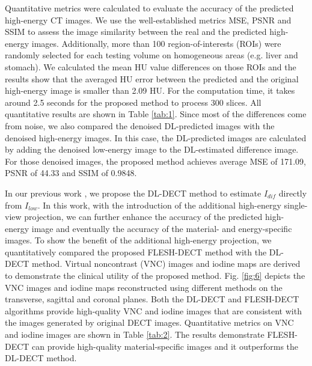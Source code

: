 \documentclass[journal,twoside,web]{ieeecolor}
\begin{document}
Quantitative metrics were calculated to evaluate the accuracy of the predicted high-energy CT images. We use the well-established metrics MSE, PSNR and SSIM to assess the image similarity between the real and the predicted high-energy images. Additionally, more than 100 region-of-interests (ROIs) were randomly selected for each testing volume on homogeneous areas (e.g. liver and stomach). We calculated the mean HU value differences on those ROIs and the results show that the averaged HU error between the predicted and the original high-energy image is smaller than 2.09 HU. For the computation time, it takes around 2.5 seconds for the proposed method to process 300 slices. All quantitative results are shown in Table \ref{tab:1}.
Since most of the differences come from noise, we also compared the denoised DL-predicted images with the denoised high-energy images. In this case, the DL-predicted images are calculated by adding the denoised low-energy image to the DL-estimated difference image. For those denoised images, the proposed method achieves average MSE of 171.09, PSNR of 44.33 and SSIM of 0.9848.

In our previous work \cite{ref46}, we propose the DL-DECT method to estimate \(I_{dif}\) directly from \(I_{low}\). In this work, with the introduction of the additional high-energy single-view projection, we can further enhance the accuracy of the predicted high-energy image and eventually the accuracy of the material- and energy-specific images. To show the benefit of the additional high-energy projection, we quantitatively compared the proposed FLESH-DECT method with the DL-DECT method.
Virtual noncontrast (VNC) images and iodine maps are derived to demonstrate the clinical utility of the proposed method. Fig. \ref{fig:6} depicts the VNC images and iodine maps reconstructed using different methods on the transverse, sagittal and coronal planes. Both the DL-DECT and FLESH-DECT algorithms provide high-quality VNC and iodine images that are consistent with the images generated by original DECT images. Quantitative metrics on VNC and iodine images are shown in Table \ref{tab:2}. The results demonstrate FLESH-DECT can provide high-quality material-specific images and it outperforms the DL-DECT method.
\end{document}
